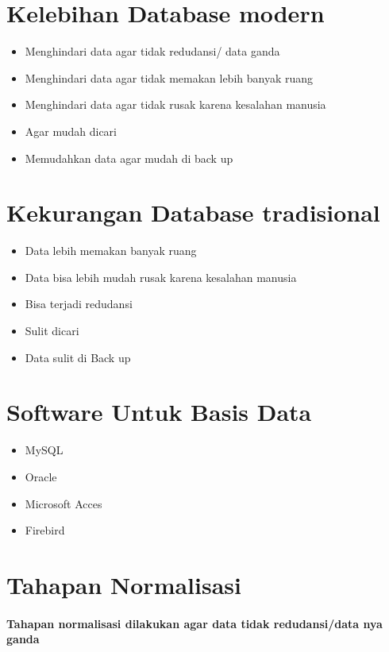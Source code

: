 \documentclass[10pt]{article}
\begin{document}
 \section*{Kelebihan Database modern}
\begin{itemize}
  \item Menghindari data agar tidak redudansi/ data ganda
  \item Menghindari data agar tidak memakan lebih banyak ruang
  \item Menghindari data agar tidak rusak karena kesalahan manusia
  \item Agar mudah dicari
  \item Memudahkan data agar mudah di back up
 \end{itemize}

\newpage
 
 \section*{Kekurangan Database tradisional}
\begin{itemize}
  \item Data lebih memakan banyak ruang
  \item Data bisa lebih mudah rusak karena kesalahan manusia
  \item Bisa terjadi redudansi
  \item Sulit dicari
  \item Data sulit di Back up
 \end{itemize}
 
 \section*{Software Untuk Basis Data}
 \begin{itemize}
  \item MySQL
  \item Oracle
  \item Microsoft Acces
  \item Firebird
 \end{itemize}
 

\section*{Tahapan Normalisasi}
\paragraph{Tahapan normalisasi dilakukan agar data tidak redudansi/data nya ganda}
\end{document}
